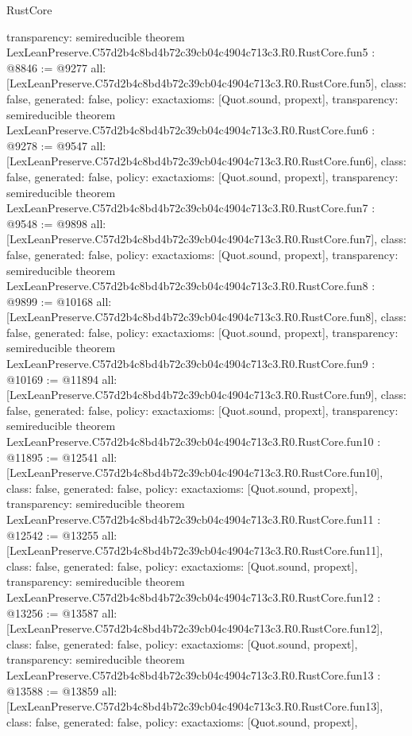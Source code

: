 \begin{lexlean}{RustCore}
\begin{coremodule}
{  transparency: semireducible
}
theorem LexLeanPreserve.C57d2b4c8bd4b72c39cb04c4904c713c3.R0.RustCore.fun5 : @8846 := @9277 {
  all: [LexLeanPreserve.C57d2b4c8bd4b72c39cb04c4904c713c3.R0.RustCore.fun5],
  class: false,
  generated: false,
  policy: exact{axioms: [Quot.sound, propext]},
  transparency: semireducible
}
theorem LexLeanPreserve.C57d2b4c8bd4b72c39cb04c4904c713c3.R0.RustCore.fun6 : @9278 := @9547 {
  all: [LexLeanPreserve.C57d2b4c8bd4b72c39cb04c4904c713c3.R0.RustCore.fun6],
  class: false,
  generated: false,
  policy: exact{axioms: [Quot.sound, propext]},
  transparency: semireducible
}
theorem LexLeanPreserve.C57d2b4c8bd4b72c39cb04c4904c713c3.R0.RustCore.fun7 : @9548 := @9898 {
  all: [LexLeanPreserve.C57d2b4c8bd4b72c39cb04c4904c713c3.R0.RustCore.fun7],
  class: false,
  generated: false,
  policy: exact{axioms: [Quot.sound, propext]},
  transparency: semireducible
}
theorem LexLeanPreserve.C57d2b4c8bd4b72c39cb04c4904c713c3.R0.RustCore.fun8 : @9899 := @10168 {
  all: [LexLeanPreserve.C57d2b4c8bd4b72c39cb04c4904c713c3.R0.RustCore.fun8],
  class: false,
  generated: false,
  policy: exact{axioms: [Quot.sound, propext]},
  transparency: semireducible
}
theorem LexLeanPreserve.C57d2b4c8bd4b72c39cb04c4904c713c3.R0.RustCore.fun9 : @10169 := @11894 {
  all: [LexLeanPreserve.C57d2b4c8bd4b72c39cb04c4904c713c3.R0.RustCore.fun9],
  class: false,
  generated: false,
  policy: exact{axioms: [Quot.sound, propext]},
  transparency: semireducible
}
theorem LexLeanPreserve.C57d2b4c8bd4b72c39cb04c4904c713c3.R0.RustCore.fun10 : @11895 := @12541 {
  all: [LexLeanPreserve.C57d2b4c8bd4b72c39cb04c4904c713c3.R0.RustCore.fun10],
  class: false,
  generated: false,
  policy: exact{axioms: [Quot.sound, propext]},
  transparency: semireducible
}
theorem LexLeanPreserve.C57d2b4c8bd4b72c39cb04c4904c713c3.R0.RustCore.fun11 : @12542 := @13255 {
  all: [LexLeanPreserve.C57d2b4c8bd4b72c39cb04c4904c713c3.R0.RustCore.fun11],
  class: false,
  generated: false,
  policy: exact{axioms: [Quot.sound, propext]},
  transparency: semireducible
}
theorem LexLeanPreserve.C57d2b4c8bd4b72c39cb04c4904c713c3.R0.RustCore.fun12 : @13256 := @13587 {
  all: [LexLeanPreserve.C57d2b4c8bd4b72c39cb04c4904c713c3.R0.RustCore.fun12],
  class: false,
  generated: false,
  policy: exact{axioms: [Quot.sound, propext]},
  transparency: semireducible
}
theorem LexLeanPreserve.C57d2b4c8bd4b72c39cb04c4904c713c3.R0.RustCore.fun13 : @13588 := @13859 {
  all: [LexLeanPreserve.C57d2b4c8bd4b72c39cb04c4904c713c3.R0.RustCore.fun13],
  class: false,
  generated: false,
  policy: exact{axioms: [Quot.sound, propext]},
}
\end{coremodule}
\end{lexlean}
